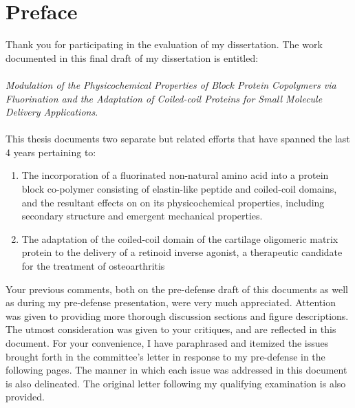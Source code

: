 \section{Preface}

Thank you for participating in the evaluation of my dissertation. The work
documented in this final draft of my dissertation is entitled:
\hspace{0pt}\\
\hspace{0pt}\\
\emph{Modulation of the Physicochemical Properties of Block Protein Copolymers
via Fluorination and the Adaptation of Coiled-coil Proteins for Small Molecule
Delivery Applications}.
\hspace{0pt}\\
\hspace{0pt}\\
This thesis documents two separate but related efforts that have spanned the
last 4 years pertaining to:
   
\begin{enumerate}

    \item The incorporation of a fluorinated non-natural amino acid into a
        protein block co-polymer consisting of elastin-like peptide and
        coiled-coil domains, and the resultant effects on on its physicochemical
        properties, including secondary structure and emergent mechanical
        properties.

    \item The adaptation of the coiled-coil domain of the cartilage oligomeric
        matrix protein to the delivery of a retinoid inverse agonist, a
        therapeutic candidate for the treatment of osteoarthritis

\end{enumerate}

Your previous comments, both on the pre-defense draft of this documents as well
as during my pre-defense presentation, were very much appreciated. Attention was
given to providing more thorough discussion sections and figure descriptions.
The utmost consideration was given to your critiques, and are reflected in this
document.  For your convenience, I have paraphrased and itemized the issues
brought forth in the committee's letter in response to my pre-defense in the
following pages.  The manner in which each issue was addressed in this document
is also delineated. The original letter following my qualifying examination is
also provided.


